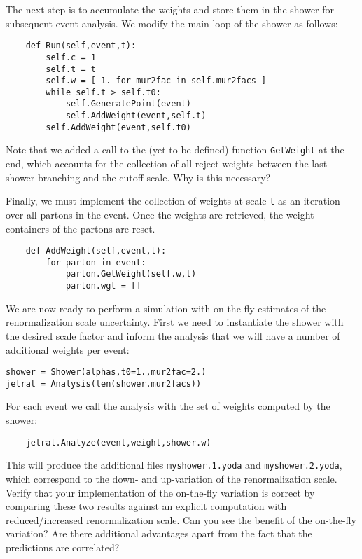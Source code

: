 \documentclass[10pt,fleqn]{scrartcl}
\begin{document}
The next step is to accumulate the weights and store them in the shower
for subsequent event analysis. We modify the main loop of the shower
as follows:
\begin{verbatim}
    def Run(self,event,t):
        self.c = 1
        self.t = t
        self.w = [ 1. for mur2fac in self.mur2facs ]
        while self.t > self.t0:
            self.GeneratePoint(event)
            self.AddWeight(event,self.t)
        self.AddWeight(event,self.t0)
\end{verbatim}
Note that we added a call to the (yet to be defined) function {\tt GetWeight}
at the end, which accounts for the collection of all reject weights between
the last shower branching and the cutoff scale. Why is this necessary?

Finally, we must implement the collection of weights at scale {\tt t} as an
iteration over all partons in the event. Once the weights are retrieved,
the weight containers of the partons are reset.
\begin{verbatim}
    def AddWeight(self,event,t):
        for parton in event:
            parton.GetWeight(self.w,t)
            parton.wgt = []
\end{verbatim}
We are now ready to perform a simulation with on-the-fly estimates
of the renormalization scale uncertainty. First we need to instantiate
the shower with the desired scale factor and inform the analysis
that we will have a number of additional weights per event:
\begin{verbatim}
shower = Shower(alphas,t0=1.,mur2fac=2.)
jetrat = Analysis(len(shower.mur2facs))
\end{verbatim}
For each event we call the analysis with the set of weights computed by the shower:
\begin{verbatim}
    jetrat.Analyze(event,weight,shower.w)
\end{verbatim}
This will produce the additional files {\tt myshower.1.yoda} and {\tt myshower.2.yoda},
which correspond to the down- and up-variation of the renormalization scale.
Verify that your implementation of the on-the-fly variation is correct by comparing
these two results against an explicit computation with reduced/increased
renormalization scale. Can you see the benefit of the on-the-fly variation?
Are there additional advantages apart from the fact that the predictions are correlated?
\clearpage
\end{document}
